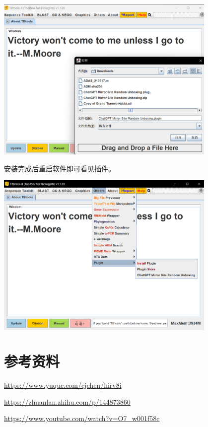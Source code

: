 \includegraphics[width=0.8\textwidth]{./image/gdk/8.3.2.png}

安装完成后重启软件即可看见插件。

\includegraphics[width=0.8\textwidth]{./image/gdk/8.3.3.png}

\section*{参考资料}
\href{https://www.yuque.com/cjchen/hirv8i}{https://www.yuque.com/cjchen/hirv8i}

\href{https://zhuanlan.zhihu.com/p/144873860}{https://zhuanlan.zhihu.com/p/144873860}

\href{https://www.youtube.com/watch?v=O7\_w001f58c}{https://www.youtube.com/watch?v=O7\_w001f58c}